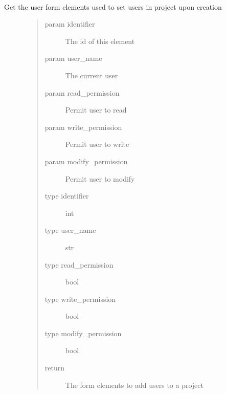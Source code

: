 \documentclass[letterpaper,10pt,english]{sphinxmanual}
\begin{document}
\begin{fulllineitems}
\label{\detokenize{index:views.forms.get_user_form_elements}}~\begin{description}
\item[{Get the user form elements used to set users in project upon creation}] \leavevmode\begin{quote}\begin{description}
\item[{param identifier}] \leavevmode
The id of this element

\item[{param user\_name}] \leavevmode
The current user

\item[{param read\_permission}] \leavevmode
Permit user to read

\item[{param write\_permission}] \leavevmode
Permit user to write

\item[{param modify\_permission}] \leavevmode
Permit user to modify

\item[{type identifier}] \leavevmode
int

\item[{type user\_name}] \leavevmode
str

\item[{type read\_permission}] \leavevmode
bool

\item[{type write\_permission}] \leavevmode
bool

\item[{type modify\_permission}] \leavevmode
bool

\item[{return}] \leavevmode
The form elements to add users to a project

\end{description}\end{quote}

\end{description}

\end{fulllineitems}

\label{\detokenize{index:module-views.utils}}
\end{document}
